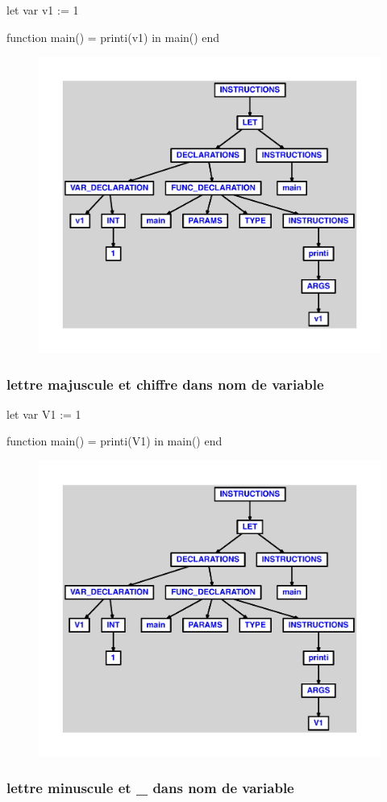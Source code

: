 \documentclass{article}
\begin{document}
\begin{verbatimtab}
let
	var v1 := 1

	function main() = printi(v1)
in main() end
\end{verbatimtab}
\begin{figure}[H]\centering\includegraphics[max width=\textwidth]{ast/ast_308.pdf}\end{figure}\subsubsection{lettre majuscule et chiffre dans nom de variable}
\begin{verbatimtab}
let
	var V1 := 1

	function main() = printi(V1)
in main() end
\end{verbatimtab}
\begin{figure}[H]\centering\includegraphics[max width=\textwidth]{ast/ast_309.pdf}\end{figure}\subsubsection{lettre minuscule et \_ dans nom de variable}
\end{document}
